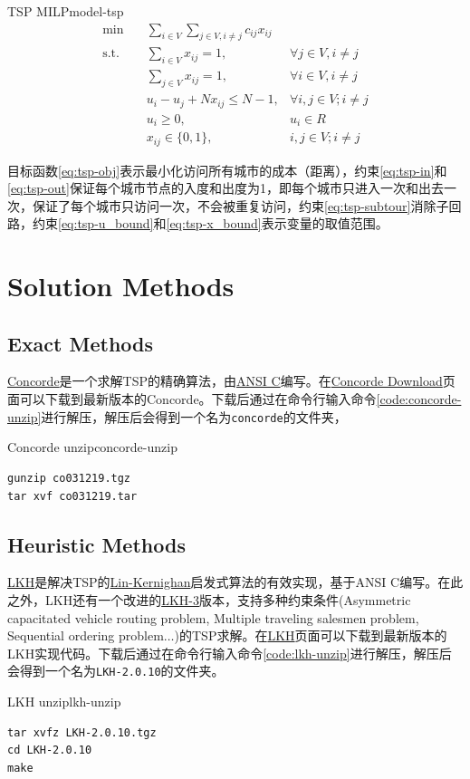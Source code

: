 \begin{model}{TSP MILP}{model-tsp}
\begin{align}
    \min \quad & \sum_{i \in V}\sum_{j \in V, i \neq j} c_{ij}x_{ij} & \label{eq:tsp-obj}\\
    \text{s.t.} \quad & \sum_{i \in V} x_{ij} = 1, & \forall j \in V, i \neq j\label{eq:tsp-in}\\
    \quad & \sum_{j \in V} x_{ij} = 1, & \forall i \in V, i \neq j \label{eq:tsp-out}\\
    \quad & u_i - u_j + Nx_{ij} \leq N - 1, & \forall i, j \in V; i \neq j \label{eq:tsp-subtour}\\
    \quad & u_i \geq 0, & u_i \in R \label{eq:tsp-u_bound}\\
    \quad & x_{ij} \in \{0, 1\}, & i, j \in V; i \neq j\label{eq:tsp-x_bound}
\end{align}
\end{model}

目标函数\ref{eq:tsp-obj}表示最小化访问所有城市的成本（距离），约束\ref{eq:tsp-in}和\ref{eq:tsp-out}保证每个城市节点的入度和出度为1，即每个城市只进入一次和出去一次，保证了每个城市只访问一次，不会被重复访问，约束\ref{eq:tsp-subtour}消除子回路，约束\ref{eq:tsp-u_bound}和\ref{eq:tsp-x_bound}表示变量的取值范围。

\section{Solution Methods}

\subsection{Exact Methods}
\href{https://www.math.uwaterloo.ca/tsp/concorde/index.html}{Concorde}是一个求解TSP的精确算法，由\href{https://www.wikiwand.com/en/articles/ANSI_C}{ANSI C}编写。在\href{https://www.math.uwaterloo.ca/tsp/concorde/downloads/downloads.htm}{Concorde Download}页面可以下载到最新版本的Concorde。下载后通过在命令行输入命令\ref{code:concorde-unzip}进行解压，解压后会得到一个名为\texttt{concorde}的文件夹，

\begin{code}{Concorde unzip}{concorde-unzip}
\begin{verbatim}
gunzip co031219.tgz
tar xvf co031219.tar
\end{verbatim}
\end{code}

\subsection{Heuristic Methods}
\href{http://akira.ruc.dk/~keld/research/LKH/}{LKH}是解决TSP的\href{https://www.wikiwand.com/en/articles/Lin%E2%80%93Kernighan_heuristic}{Lin-Kernighan}启发式算法的有效实现，基于ANSI C编写。在此之外，LKH还有一个改进的\href{http://akira.ruc.dk/~keld/research/LKH-3/}{LKH-3}版本，支持多种约束条件(Asymmetric capacitated vehicle routing problem, Multiple traveling salesmen problem, Sequential ordering problem$\dots$)的TSP求解。在\href{http://akira.ruc.dk/~keld/research/LKH/}{LKH}页面可以下载到最新版本的LKH实现代码。下载后通过在命令行输入命令\ref{code:lkh-unzip}进行解压，解压后会得到一个名为\texttt{LKH-2.0.10}的文件夹。

\begin{code}{LKH unzip}{lkh-unzip}
\begin{verbatim}
tar xvfz LKH-2.0.10.tgz
cd LKH-2.0.10
make
\end{verbatim}
\end{code}
